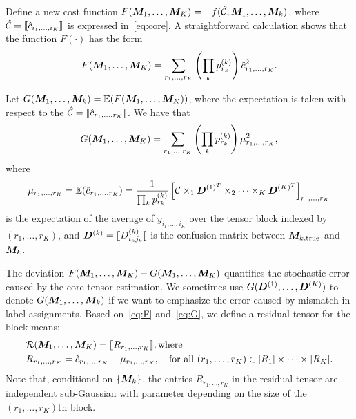 \documentclass{article}
\begin{document}
\begin{appendices}
\begin{enumerate}
Define a new cost function $F(\bm M_1,\ldots,\bm M_K)= -f(\hat {\mathcal{C}}, \bm M_1,\ldots,\bm M_k)$, where $\hat {\mathcal{C}}=\llbracket \hat c_{i_1,\ldots,i_K} \rrbracket$ is expressed in~\eqref{eq:core}. A straightforward calculation shows that the function $F(\cdot)$ has the form
\begin{equation}\label{eq:F}
F(\bm M_1,\ldots,\bm M_K) = \sum_{r_1,\ldots,r_K}\left(\prod_k p^{(k)}_{r_k}\right) \hat c_{r_1,\ldots,r_K}^2.
\end{equation}


Let $G(\bm M_1,\ldots,\bm M_k)=\mathbb{E}(F(\bm M_1,\ldots,\bm M_K))$, where the expectation is taken with respect to the $\hat {\mathcal{C}}=\llbracket  \hat c_{r_1,\ldots,r_K} \rrbracket$. We have that  
\begin{equation}\label{eq:G}
G(\bm M_1,\ldots,\bm M_K)=\sum_{r_1,\ldots,r_K} \left(\prod_k p^{(k)}_{r_k}\right) \mu^2_{r_1,\ldots,r_K},
\end{equation}
where
\[
\mu_{r_1,\ldots,r_K}=\mathbb{E}(\hat c_{r_1,\ldots,r_K})={1\over \prod_k p^{(k)}_{r_k}}\left[ \mathcal{C}\times_1 \bm{D}^{(1)^T} \times_2\cdots\times_K \bm{D}^{(K)^T}\right]_{r_1,\ldots,r_K}
\]
is the expectation of the average of $y_{i_1,\ldots,i_K}$ over the tensor block indexed by $(r_1,\ldots,r_K)$, and $\bm{D}^{(k)}=\llbracket D^{(k)}_{i_kj_k} \rrbracket$ is the confusion matrix between $\bm M_{k,\text{true}}$ and $\bm M_k$.

The deviation $F(\bm M_1,\ldots,\bm M_K)-G(\bm M_1,\ldots,\bm M_K)$ quantifies the stochastic error caused by the core tensor estimation. We sometimes use $G(\bm{D}^{(1)},\ldots,\bm{D}^{(K)})$ to denote $G(\bm M_1,\ldots,\bm M_k)$ if we want to emphasize the error caused by mismatch in label assignments. 
Based on~\eqref{eq:F} and~\eqref{eq:G}, we define a residual tensor for the block means:
\begin{align}\label{eq:residual}
&\mathcal{R}(\bm M_1,\ldots,\bm M_K)=\llbracket R_{r_1,\ldots,r_K} \rrbracket,\text{where}\\
&R_{r_1,\ldots,r_K}= \hat c_{r_1,\ldots,r_K}-\mu_{r_1,\ldots,r_K} ,\quad \text{for all }(r_1,\ldots,r_K)\in[R_1]\times\cdots\times[R_K].
\end{align}
Note that, conditional on $\{\bm M_k\}$, the entries $R_{r_1,\ldots,r_K}$ in the residual tensor are independent sub-Gaussian with parameter depending on the size of the $(r_1,\ldots,r_K)$th block. 



\end{enumerate}
\end{appendices}
\end{document}
